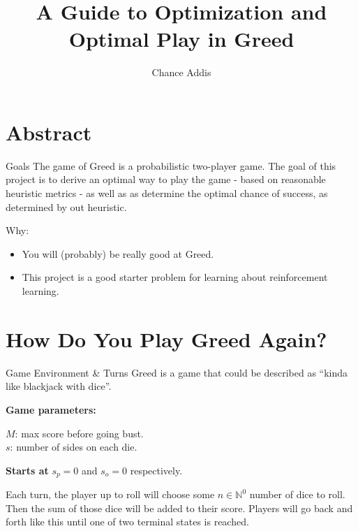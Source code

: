 \documentclass{beamer}
\title{A Guide to Optimization and Optimal Play in Greed}
\author{Chance Addis}
\affil{Department of Mathematics and Statistics, Reed College}
\begin{document}
\maketitle

\section{Abstract}

\begin{frame}{Goals}
    The game of Greed is a probabilistic two-player game. The goal of this project is to derive an optimal way to play the game - based on reasonable heuristic metrics - as well as as determine the optimal chance of success, as determined by out heuristic.
\end{frame}

\begin{frame}
    Why:

    \begin{itemize}
        \item You will (probably) be really good at Greed.
        \item This project is a good starter problem for learning about reinforcement learning.
    \end{itemize}
\end{frame}

\section{How Do You Play Greed Again?}
\begin{frame}{Game Environment \& Turns}
    Greed is a game that could be described as ``kinda like blackjack with dice''.

    \textbf{Game parameters:}

    $M$: max score before going bust. \\
    $s$: number of sides on each die.

    \textbf{Starts at}
    $s_p = 0$ and $s_o = 0$ respectively.

    Each turn, the player up to roll will choose some $n \in \mathbb{N}^0$ number of dice to roll. Then the sum of those dice will be added to their score. Players will go back and forth like this until one of two terminal states is reached.
\end{frame}
\end{document}
